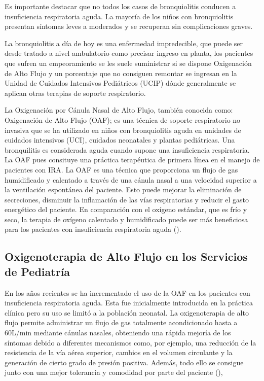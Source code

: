 Es importante destacar que no todos los casos de bronquiolitis conducen a insuficiencia respiratoria aguda. La mayoría de los niños con bronquiolitis presentan síntomas leves a moderados y se recuperan sin complicaciones graves. 

La bronquiolitis a día de hoy es una enfermedad impredecible, que puede ser desde tratado a nivel ambulatorio como precisar ingreso en planta, los pacientes que sufren un empeoramiento se les suele suministrar si se dispone Oxigenación de Alto Flujo y un porcentaje que no consiguen remontar se ingresan en la Unidad de Cuidados Intensivos Pediátricos (UCIP) dónde generalmente se aplican otras terapias de soporte respiratorio. 

La Oxigenación por Cánula Nasal de Alto Flujo, también conocida como: Oxigenación de Alto Flujo (OAF); es una técnica de soporte respiratorio no invasiva que se ha utilizado en niños con bronquiolitis aguda en unidades de cuidados intensivos (UCI), cuidados neonatales y plantas pediátricas. Una bronquilitis es considerada aguda cuando supone una insuficiencia respiratoria. La OAF pues consituye una práctica terapéutica de primera línea en el manejo de pacientes con IRA. La OAF es una técnica que proporciona un flujo de gas humidificado y calentado a través de una cánula nasal a una velocidad superior a la ventilación espontánea del paciente. Esto puede mejorar la eliminación de secreciones, disminuir la inflamación de las vías respiratorias y reducir el gasto energético del paciente. En comparación con el oxígeno estándar, que es frío y seco, la terapia de oxígeno calentado y humidificado puede ser más beneficiosa para los pacientes con insuficiencia respiratoria aguda (\cite{Daverio2019}).


\subsection{Oxigenoterapia de Alto Flujo en los Servicios de Pediatría} 

En los años recientes se ha incrementado el uso de la OAF en los pacientes con insuficiencia respiratoria aguda. Esta fue inicialmente introducida en la práctica clínica pero su uso se limitó a la población neonatal. La oxigenoterapia de alto flujo permite administrar un flujo de gas totalmente acondicionado hasta a 60L/min mediante cánulas nasales, obteniendo una rápida mejoría de los síntomas debido a diferentes mecanismos como, por ejemplo, una reducción de la resistencia de la vía aérea superior, cambios en el volumen circulante y la generación de cierto grado de presión positiva. Además, todo ello se consigue junto con una mejor tolerancia y comodidad por parte del paciente (\cite{Masclans2015}),

